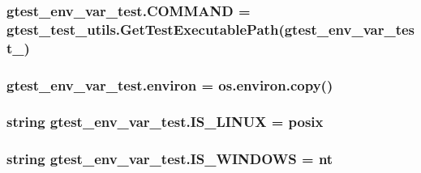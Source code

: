 \subsubsection[{\texorpdfstring{C\+O\+M\+M\+A\+ND}{COMMAND}}]{\setlength{\rightskip}{0pt plus 5cm}gtest\+\_\+env\+\_\+var\+\_\+test.\+C\+O\+M\+M\+A\+ND = {\bf gtest\+\_\+test\+\_\+utils.\+Get\+Test\+Executable\+Path}(\textquotesingle{}gtest\+\_\+env\+\_\+var\+\_\+test\+\_\+\textquotesingle{})}\hypertarget{namespacegtest__env__var__test_a36e02e39934750d022966df31c568a53}{}\label{namespacegtest__env__var__test_a36e02e39934750d022966df31c568a53}
\subsubsection[{\texorpdfstring{environ}{environ}}]{\setlength{\rightskip}{0pt plus 5cm}gtest\+\_\+env\+\_\+var\+\_\+test.\+environ = os.\+environ.\+copy()}\hypertarget{namespacegtest__env__var__test_ac671a59c1b805f7e9511e91380865cda}{}\label{namespacegtest__env__var__test_ac671a59c1b805f7e9511e91380865cda}
\subsubsection[{\texorpdfstring{I\+S\+\_\+\+L\+I\+N\+UX}{IS_LINUX}}]{\setlength{\rightskip}{0pt plus 5cm}string gtest\+\_\+env\+\_\+var\+\_\+test.\+I\+S\+\_\+\+L\+I\+N\+UX = \textquotesingle{}posix\textquotesingle{}}\hypertarget{namespacegtest__env__var__test_a33b1e2e9afe9d59d75503de4a1297486}{}\label{namespacegtest__env__var__test_a33b1e2e9afe9d59d75503de4a1297486}
\subsubsection[{\texorpdfstring{I\+S\+\_\+\+W\+I\+N\+D\+O\+WS}{IS_WINDOWS}}]{\setlength{\rightskip}{0pt plus 5cm}string gtest\+\_\+env\+\_\+var\+\_\+test.\+I\+S\+\_\+\+W\+I\+N\+D\+O\+WS = \textquotesingle{}nt\textquotesingle{}}\hypertarget{namespacegtest__env__var__test_af792d1403a09d46bffcd3466821cd0fb}{}\label{namespacegtest__env__var__test_af792d1403a09d46bffcd3466821cd0fb}
